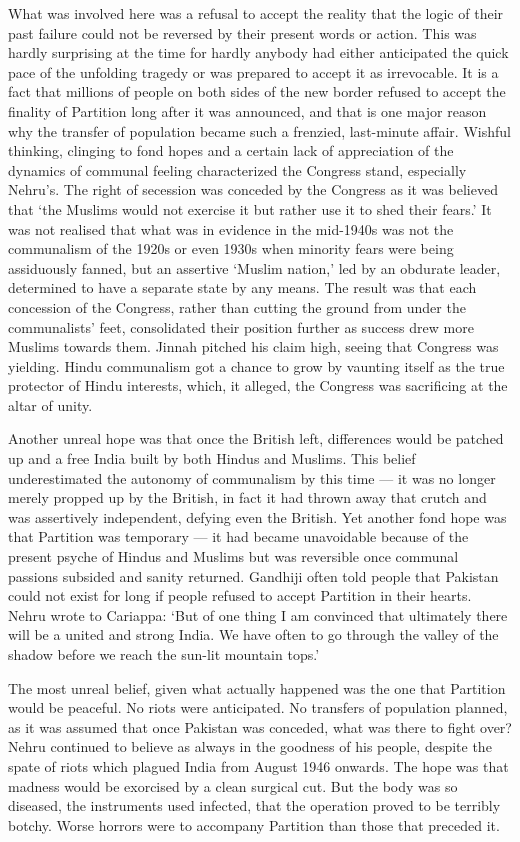What was involved here was a refusal to accept the reality that the logic of their past failure could not be reversed by their present words or action. This was hardly surprising at the time for hardly anybody had either anticipated the quick pace of the unfolding tragedy or was prepared to accept it as irrevocable. It is a fact that millions of people on both sides of the new border refused to accept the finality of Partition long after it was announced, and that is one major reason why the transfer of population became such a frenzied, last-minute affair. Wishful thinking, clinging to fond hopes and a certain lack of appreciation of the dynamics of communal feeling characterized the Congress stand, especially Nehru's. The right of secession was conceded by the Congress as it was believed that `the Muslims would not exercise it but rather use it to shed their fears.' It was not realised that what was in evidence in the mid-1940s was not the communalism of the 1920s or even 1930s when minority fears were being assiduously fanned, but an assertive `Muslim nation,' led by an obdurate leader, determined to have a separate state by any means. The result was that each concession of the Congress, rather than cutting the ground from under the communalists' feet, consolidated their position further as success drew more Muslims towards them. Jinnah pitched his claim high, seeing that Congress was yielding. Hindu communalism got a chance to grow by vaunting itself as the true protector of Hindu interests, which, it alleged, the Congress was sacrificing at the altar of unity. 

Another unreal hope was that once the British left, differences would be patched up and a free India built by both Hindus and Muslims. This belief underestimated the autonomy of communalism by this time — it was no longer merely propped up by the British, in fact it had thrown away that crutch and was assertively independent, defying even the British. Yet another fond hope was that Partition was temporary — it had became unavoidable because of the present psyche of Hindus and Muslims but was reversible once communal passions subsided and sanity returned. Gandhiji often told people that Pakistan could not exist for long if people refused to accept Partition in their hearts. Nehru wrote to Cariappa: `But of one thing I am convinced that ultimately there will be a united and strong India. We have often to go through the valley of the shadow before we reach the sun-lit mountain tops.' 

The most unreal belief, given what actually happened was the one that Partition would be peaceful. No riots were anticipated. No transfers of population planned, as it was assumed that once Pakistan was conceded, what was there to fight over? Nehru continued to believe as always in the goodness of his people, despite the spate of riots which plagued India from August 1946 onwards. The hope was that madness would be exorcised by a clean surgical cut. But the body was so diseased, the instruments used infected, that the operation proved to be terribly botchy. Worse horrors were to accompany Partition than those that preceded it. 


